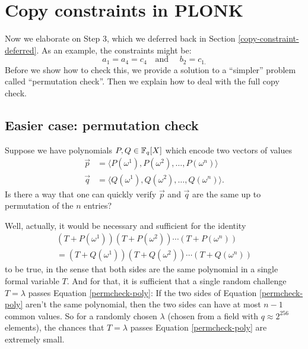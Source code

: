 \section{Copy constraints in PLONK}
\label{copy-constraints}

Now we elaborate on Step 3, which we deferred back in
Section \ref{copy-constraint-deferred}. As an example, the constraints might be:
\[a_{1} = a_{4} = c_{4}\quad\text{and }\quad b_{2} = c_{1.}\] Before we
show how to check this, we provide a solution to a ``simpler'' problem
called ``permutation check''. Then we explain how to deal with the full
copy check.

\subsection{Easier case: permutation check}

\begin{goal}{}{}
Suppose we have polynomials $P,Q \in \mathbb{F}_{q}[X]$
which encode two vectors of values \[\begin{aligned}
\overrightarrow{p} & = \langle P( \omega^{1} ),P( \omega^{2} ),\ldots,P( \omega^{n} )\rangle \\
\overrightarrow{q} & = \langle Q( \omega^{1} ),Q( \omega^{2} ),\ldots,Q( \omega^{n} )\rangle.
\end{aligned}\] Is there a way that one can quickly verify
$\overrightarrow{p}$ and $\overrightarrow{q}$ are the
same up to permutation of the $n$ entries?
\end{goal}


Well, actually, it would be necessary and sufficient for the identity
\begin{eqnarray}
\label{permcheck-poly}
( T + P( \omega^{1} ) )( T + P( \omega^{2} ) )\cdots( T + P( \omega^{n} ) ) \nonumber \\
 = ( T + Q( \omega^{1} ) )( T + Q( \omega^{2} ) )\cdots( T + Q( \omega^{n} ) )
\end{eqnarray}
to be true, in the sense that both sides are the same polynomial in a
single formal variable $T$. And for that, it is sufficient that a
single random challenge $T = \lambda$ passes
Equation \eqref{permcheck-poly}: If the two sides of
Equation \eqref{permcheck-poly} aren't the same
polynomial, then the two sides can have at most $n - 1$ common values.
So for a randomly chosen $\lambda$ (chosen from a field with
$q \approx 2^{256}$ elements), the chances that $T = \lambda$ passes
Equation \eqref{permcheck-poly} are extremely small.


